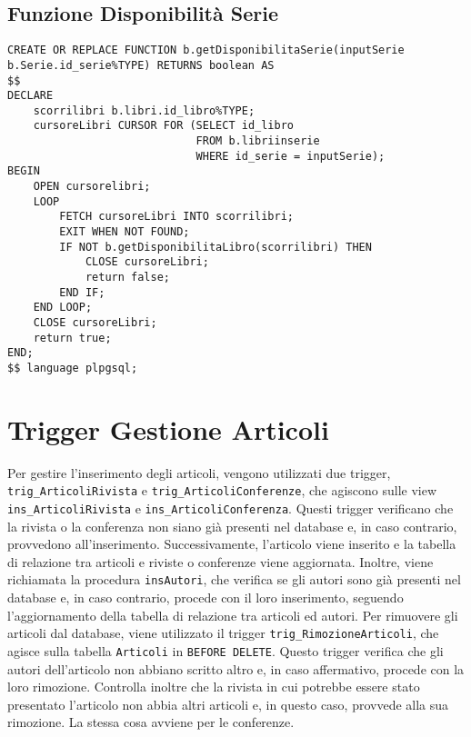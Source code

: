 \subsection{Funzione Disponibilit\`a Serie}
\begin{lstlisting}
CREATE OR REPLACE FUNCTION b.getDisponibilitaSerie(inputSerie b.Serie.id_serie%TYPE) RETURNS boolean AS
$$
DECLARE
    scorrilibri b.libri.id_libro%TYPE;
    cursoreLibri CURSOR FOR (SELECT id_libro
                             FROM b.libriinserie
                             WHERE id_serie = inputSerie);
BEGIN
    OPEN cursorelibri;
    LOOP
        FETCH cursoreLibri INTO scorrilibri;
        EXIT WHEN NOT FOUND;
        IF NOT b.getDisponibilitaLibro(scorrilibri) THEN
            CLOSE cursoreLibri;
            return false;
        END IF;
    END LOOP;
    CLOSE cursoreLibri;
    return true;
END;
$$ language plpgsql;
\end{lstlisting}

\section{Trigger Gestione Articoli}
Per gestire l'inserimento degli articoli, vengono utilizzati due trigger,
\texttt{trig\_ArticoliRivista} e \texttt{trig\_ArticoliConferenze}, che agiscono sulle view
\texttt{ins\_ArticoliRivista} e \texttt{ins\_ArticoliConferenza}. Questi trigger verificano che la rivista 
o la conferenza non siano gi\`a presenti nel database e, in caso contrario, provvedono all'inserimento. Successivamente, 
l'articolo viene inserito e la tabella di relazione tra articoli e riviste o conferenze viene aggiornata. 
Inoltre, viene richiamata la procedura \texttt{insAutori}, che verifica se gli autori sono gi\`a presenti 
nel database e, in caso contrario, procede con il loro inserimento, seguendo l'aggiornamento della tabella 
di relazione tra articoli ed autori.
Per rimuovere gli articoli dal database, viene utilizzato il trigger \texttt{trig\_RimozioneArticoli}, che 
agisce sulla tabella \texttt{Articoli} in \texttt{BEFORE DELETE}. Questo trigger verifica che gli autori 
dell'articolo non abbiano scritto altro e, in caso affermativo, procede con la loro rimozione. Controlla 
inoltre che la rivista in cui potrebbe essere stato presentato l'articolo non abbia altri articoli e, in 
questo caso, provvede alla sua rimozione. La stessa cosa avviene per le conferenze.


